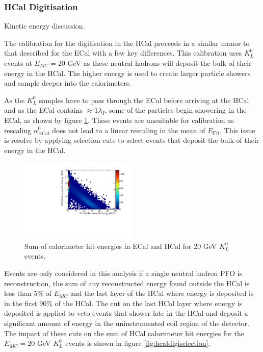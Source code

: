 
\subsubsection{HCal Digitisation}
\label{sec:hcaldigi}

Kinetic energy discussion.

The calibration for the digitisation in the HCal proceeds in a similar manor to that described for the ECal with a few key differences.  This calibration uses $K^{0}_{L}$ events at $E_{MC} = 20$ GeV as these neutral hadrons will deposit the bulk of their energy in the HCal.  The higher energy is used to create larger particle showers and sample deeper into the calorimeters.  

As the $K^{0}_{L}$ samples have to pass through the ECal before arriving at the HCal and as the ECal contains $\approx 1 \lambda_{I}$, some of the particles begin showering in the ECal, as shown by figure \ref{fig:hcaldigikaonsplit}.  These events are unsuitable for calibration as rescaling $\alpha^{0}_{\text{HCal}}$ does not lead to a linear rescaling in the mean of $E_{\text{Fit}}$.  This issue is resolve by applying selection cuts to select events that deposit the bulk of their energy in the HCal.  

\begin{figure}
\includegraphics[width=0.5\textwidth]{EnergyEstimators/Plots/Calibration/Digitsation/HCal/ECalHCalKaon0LSplit.pdf}
\caption[Sum of calorimeter hit energies in ECal and HCal for 20 GeV $K^{0}_{L}$ events.]{Sum of calorimeter hit energies in ECal and HCal for 20 GeV $K^{0}_{L}$ events.}
\label{fig:hcaldigikaonsplit}
\end{figure}

Events are only considered in this analysis if a single neutral hadron PFO is reconstruction, the sum of any reconstructed energy found outside the HCal is less than 5\% of $E_{MC}$ and the last layer of the HCal where energy is deposited is in the first 90\% of the HCal.  The cut on the last HCal layer where energy is deposited is applied to veto events that shower late in the HCal and deposit a significant amount of energy in the uninstrumented coil region of the detector.  The impact of these cuts on the sum of HCal calorimeter hit energies for the $E_{MC} = 20$ GeV $K^{0}_{L}$ events is shown in figure \ref{fig:hcaldigiselection}.

